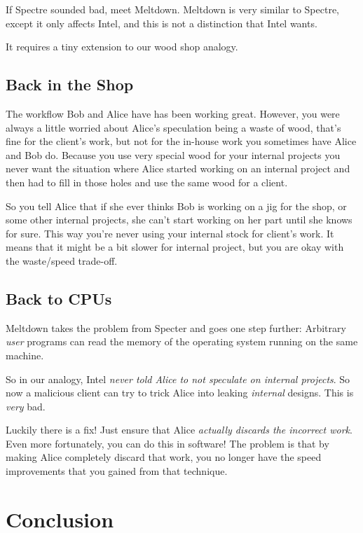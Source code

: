 \documentclass{article}
\begin{document}
If Spectre sounded bad, meet Meltdown. Meltdown is very similar to Spectre,
except it only affects Intel, and this is not a distinction that Intel wants.

It requires a tiny extension to our wood shop analogy.

\subsection*{Back in the Shop}

The workflow Bob and Alice have has been working great. However, you were
always a little worried about Alice's speculation being a waste of wood, that's
fine for the client's work, but not for the in-house work you sometimes have
Alice and Bob do. Because you use very special wood for your internal projects
you never want the situation where Alice started working on an internal project
and then had to fill in those holes and use the same wood for a client.

So you tell Alice that if she ever thinks Bob is working on a jig for the shop,
or some other internal projects, she can't start working on her part until she
knows for sure. This way you're never using your internal stock for client's
work. It means that it might be a bit slower for internal project, but you are
okay with the waste/speed trade-off.

\subsection*{Back to CPUs}

Meltdown takes the problem from Specter and goes one step further: Arbitrary
\emph{user} programs can read the memory of {the operating system} running on
the same machine.

So in our analogy, Intel \emph{never told Alice to not speculate on internal
projects}. So now a malicious client can try to trick Alice into leaking
\emph{internal} designs. This is \emph{very} bad.

Luckily there is a fix! Just ensure that Alice \emph{actually discards the
incorrect work}. Even more fortunately, you can do this in software! The
problem is that by making Alice completely discard that work, you no longer
have the speed improvements that you gained from that technique.

\section{Conclusion}
\end{document}
